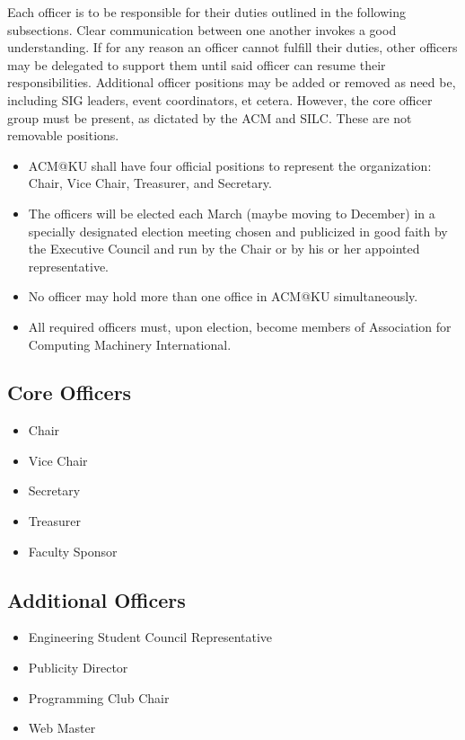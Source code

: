 Each officer is to be responsible for their duties outlined in the following
subsections. Clear communication between one another invokes a good understanding.
If for any reason an officer cannot fulfill their duties, other officers may be
delegated to support them until said officer can resume their responsibilities.
Additional officer positions may be added or removed as need be, including SIG
leaders, event coordinators, et cetera. However, the core officer group must be
present, as dictated by the ACM and SILC. These are not removable positions.\
\begin{itemize}
	\item ACM@KU shall have four official positions to represent the organization:
				Chair, Vice Chair, Treasurer, and Secretary.
	\item The officers will be elected each March (maybe moving to December) in a
				specially designated election meeting chosen and publicized in good faith
				by the Executive Council and run by the Chair or by his or her appointed
				representative.
	\item No officer may hold more than one office in ACM@KU simultaneously.
	\item All required officers must, upon election, become members of Association
				for Computing Machinery International.
\end{itemize}

\subsection{Core Officers}
\label{subsec:subsec01}

\begin{itemize}
	\item Chair
   \item Vice Chair
   \item Secretary
   \item Treasurer
   \item Faculty Sponsor
\end{itemize}

\subsection{Additional Officers}
\label{subsec:subsec02}

\begin{itemize}
	\item Engineering Student Council Representative
   \item Publicity Director
   \item Programming Club Chair
   \item Web Master
\end{itemize}

